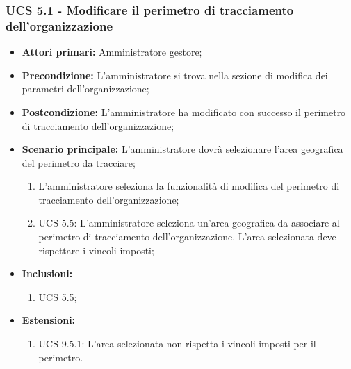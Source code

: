 \subsubsection{UCS 5.1 - Modificare il perimetro di tracciamento dell'organizzazione}%
\begin{itemize}
    \item \textbf{Attori primari:} Amministratore gestore;
    \item \textbf{Precondizione:} L'amministratore si trova nella sezione di modifica dei parametri dell'organizzazione;
    \item \textbf{Postcondizione:} L'amministratore ha modificato con successo il perimetro di tracciamento dell'organizzazione;
    \item \textbf{Scenario principale:} L'amministratore dovrà selezionare l'area geografica del perimetro da tracciare;
    \begin{enumerate}%
        \item L'amministratore seleziona la funzionalità di modifica del perimetro di tracciamento dell'organizzazione;
        \item UCS 5.5: L'amministratore seleziona un'area geografica da associare al perimetro di tracciamento dell'organizzazione. L'area selezionata deve rispettare i vincoli imposti;
    \end{enumerate}
    \item \textbf{Inclusioni:}
    \begin{enumerate}
        \item UCS 5.5;
    \end{enumerate}
    \item \textbf{Estensioni:}
    \begin{enumerate}
        \item UCS 9.5.1: L'area selezionata non rispetta i vincoli imposti per il perimetro.
    \end{enumerate}
\end{itemize}

